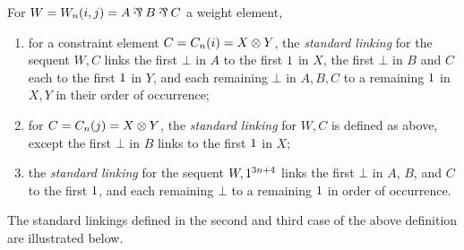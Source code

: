 \documentclass{lmcs}
\begin{document}
                                                                                                                                                                                                                                                                                                                                                                                                                                                                                  
\begin{definition}
\label{def:standard linkings}
For $W=W_n(i,j)=A\pr B\pr C$ a weight element,
\begin{enumerate}
	\item
for a constraint element $C=C_n(i)=X\otimes Y$, the \emph{standard linking} for the sequent $W,C$ links the first $\bot$ in $A$ to the first $1$ in $X$, the first $\bot$ in $B$ and $C$ each to the first $1$ in $Y$, and each remaining $\bot$ in $A,B,C$ to a remaining $1$ in $X,Y$ in their order of occurrence;
	\item
for $C=C_n(j)=X\otimes Y$, the \emph{standard linking} for $W,C$ is defined as above, except the first $\bot$ in $B$ links to the first $1$ in $X$;
	\item
the \emph{standard linking} for the sequent $W,1^{3n+4}$ links the first $\bot$ in $A$, $B$, and $C$ to the first $1$, and each remaining $\bot$ to a remaining $1$ in order of occurrence.
\end{enumerate}
\end{definition}

The standard linkings defined in the second and third case of the above definition are illustrated below.
\end{document}
